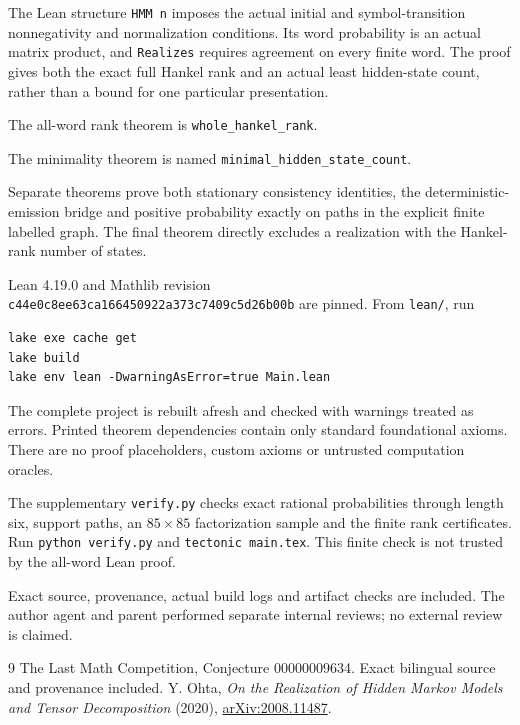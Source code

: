\documentclass[11pt]{article}
\begin{document}
The Lean structure \texttt{HMM n} imposes the actual
initial and symbol-transition nonnegativity and
normalization conditions. Its word probability is an
actual matrix product, and \texttt{Realizes} requires
agreement on every finite word. The proof gives both the
exact full Hankel rank and an actual least hidden-state
count, rather than a bound for one particular presentation.

The all-word rank theorem is \texttt{whole\_hankel\_rank}.
\par
The minimality theorem is named
\texttt{minimal\_hidden\_state\_count}.
\par
Separate theorems prove both stationary consistency
identities, the deterministic-emission bridge and positive
probability exactly on paths in the explicit finite
labelled graph. The final theorem directly excludes a
realization with the Hankel-rank number of states.

Lean 4.19.0 and Mathlib revision\\
\texttt{c44e0c8ee63ca166450922a373c7409c5d26b00b}
are pinned. From \texttt{lean/}, run
\begin{verbatim}
lake exe cache get
lake build
lake env lean -DwarningAsError=true Main.lean
\end{verbatim}
The complete project is rebuilt afresh and checked with
warnings treated as errors. Printed theorem dependencies
contain only standard foundational axioms. There are no
proof placeholders, custom axioms or untrusted computation
oracles.

The supplementary \texttt{verify.py} checks exact rational
probabilities through length six, support paths, an
$85\times85$ factorization sample and the finite rank
certificates. Run \texttt{python verify.py} and
\texttt{tectonic main.tex}. This finite check is not
trusted by the all-word Lean proof.

Exact source, provenance, actual build logs and artifact
checks are included. The author agent and parent performed
separate internal reviews; no external review is claimed.

\begin{thebibliography}{9}
 The Last Math Competition,
Conjecture 00000009634. Exact bilingual source and provenance included.
 Y. Ohta, \emph{On the Realization of Hidden
Markov Models and Tensor Decomposition} (2020),
\href{https://arxiv.org/abs/2008.11487}{arXiv:2008.11487}.
\end{thebibliography}
\end{document}
